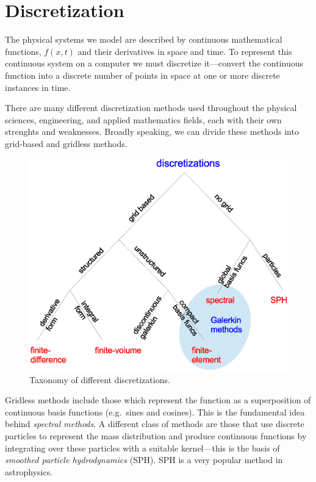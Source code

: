 \section{Discretization}

The physical systems we model are described by continuous mathematical
functions, $f(x,t)$ and their derivatives in space and time.  To
represent this continuous system on a computer we must discretize
it---convert the continuous function into a discrete number of points
in space at one or more discrete instances in time.

There are many different discretization methods used throughout the
physical sciences, engineering, and applied mathematics fields, each
with their own strenghts and weaknesses.  Broadly speaking, we can
divide these methods into grid-based and gridless methods.  

\begin{figure}[h]
\centering
\includegraphics[width=\linewidth]{discretizations}
\caption{\label{fig:disc} Taxonomy of different discretizations.}
\end{figure}

Gridless methods include those which represent the function as a
superposition of continuous basis functions (e.g.\ sines and cosines).
This is the fundamental idea behind {\em spectral methods}.  A different
class of methods are those that use discrete particles to represent the
mass distribution and produce continuous functions by integrating
over these particles with a suitable kernel---this is the basis of
{\em smoothed particle hydrodynamics} (SPH).  SPH is a very popular
method in astrophysics.


